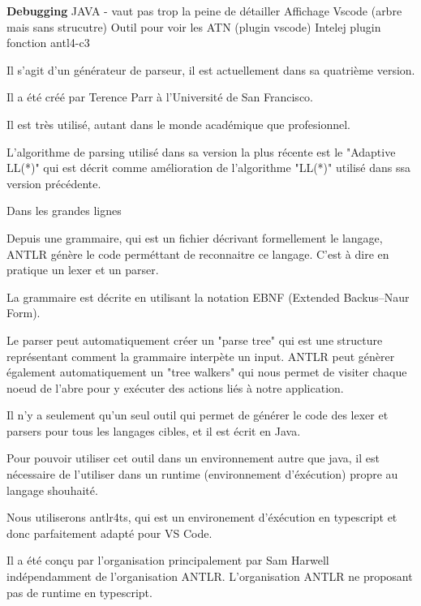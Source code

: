 \documentclass[
    iict, %
    il, %
]{heig-tb}
\begin{document}
\textbf{Debugging}
JAVA - vaut pas trop la peine de détailler
Affichage Vscode (arbre mais sans strucutre)
Outil pour voir les ATN (plugin vscode)
Intelej plugin
fonction antl4-c3


Il s'agit d'un générateur de parseur, il est actuellement dans sa quatrième version.

Il a été créé par Terence Parr à l'Université de San Francisco.

Il est très utilisé, autant dans le monde académique que profesionnel.

L'algorithme de parsing utilisé dans sa version la plus récente est le "Adaptive LL(*)" qui est décrit comme amélioration de l'algorithme
"LL(*)" utilisé dans ssa version précédente.


Dans les grandes lignes  %

Depuis une grammaire, qui est un fichier décrivant formellement le langage, ANTLR génère le code perméttant de reconnaitre ce langage.
C'est à dire en pratique un lexer et un parser.

La grammaire est décrite en utilisant la notation EBNF (Extended Backus–Naur Form).

Le parser peut automatiquement créer un "parse tree" qui est une structure représentant comment la grammaire interpète un input.
ANTLR peut génèrer également automatiquement un "tree walkers" qui nous permet de visiter chaque noeud de l'abre pour y exécuter des actions liés à notre application.

Il n'y a seulement qu'un seul outil qui permet de générer le code des lexer et parsers pour tous les langages cibles, et il est écrit en Java.

Pour pouvoir utiliser cet outil dans un environnement autre que java, il est nécessaire de l'utiliser dans un runtime (environnement d'éxécution) propre au langage shouhaité.


Nous utiliserons antlr4ts, qui est un environement d'éxécution en typescript et donc parfaitement adapté pour VS Code.

Il a été conçu par l'organisation principalement par Sam Harwell indépendamment de l'organisation ANTLR.
L'organisation ANTLR ne proposant pas de runtime en typescript. %
\end{document}
